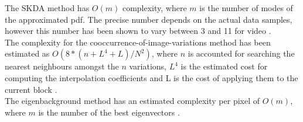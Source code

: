 The SKDA method has $O(m)$ complexity, where $m$ is the number of modes of
the approximated pdf. 
The precise number depends on the actual data samples, however this number has been shown to vary between 3 and 11 for video \cite{Han2007}.\\

The complexity for the cooccurrence-of-image-variations method has been
estimated as $O(8*(n+L^4+L)/N^2)$, where $n$ is accounted for searching the nearest neighbours amongst the $n$ variations, $L^4$ is the estimated cost for computing the interpolation coefficients and L is the cost of applying them to the current block \cite{Piccardi2004}.\\

The eigenbackground method has an estimated complexity per pixel of $O(m)$, where $m$ is the number of the best eigenvectors \cite{Piccardi2004}.\\
